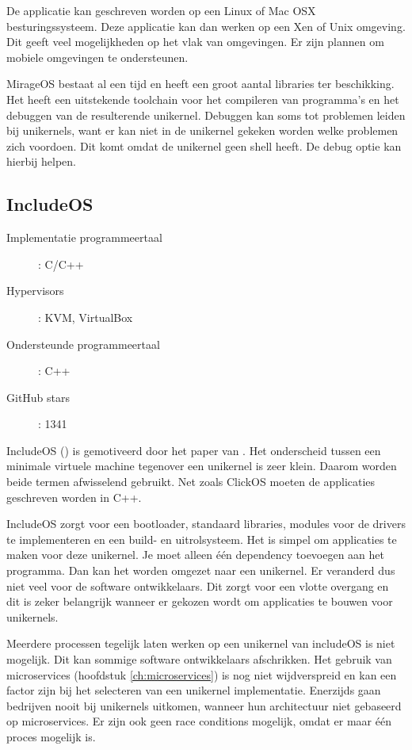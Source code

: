 De applicatie kan geschreven worden op een Linux of Mac OSX besturingssysteem. Deze applicatie kan dan werken op een Xen of Unix omgeving. Dit geeft veel mogelijkheden op het vlak van omgevingen. Er zijn plannen om mobiele omgevingen te ondersteunen.

MirageOS bestaat al een tijd en heeft een groot aantal libraries ter beschikking. Het heeft een uitstekende toolchain voor het compileren van programma's en het debuggen van de resulterende unikernel. Debuggen kan soms tot problemen leiden bij unikernels, want er kan niet in de unikernel gekeken worden welke problemen zich voordoen. Dit komt omdat de unikernel geen shell heeft. De debug optie kan hierbij helpen.

\subsection{IncludeOS}
\begin{description}
  \item [Implementatie programmeertaal]: C/C++
  \item [Hypervisors]: KVM, VirtualBox
  \item [Ondersteunde programmeertaal]: C++
  \item [GitHub stars]: 1341
\end{description}

IncludeOS (\cite{oslo_and_akershus_university_college_hioa-cs/includeos_????}) is gemotiveerd door het paper van \cite{bratterud_maximizing_2013}. Het onderscheid tussen een minimale virtuele machine tegenover een unikernel is zeer klein. Daarom worden beide termen afwisselend gebruikt. Net zoals ClickOS moeten de applicaties geschreven worden in C++.

IncludeOS zorgt voor een bootloader, standaard libraries, modules voor de drivers te implementeren en een build- en uitrolsysteem. Het is simpel om applicaties te maken voor deze unikernel. Je moet alleen één dependency toevoegen aan het programma. Dan kan het worden omgezet naar een unikernel. Er veranderd dus niet veel voor de software ontwikkelaars. Dit zorgt voor een vlotte overgang en dit is zeker belangrijk wanneer er gekozen wordt om applicaties te bouwen voor unikernels.

Meerdere processen tegelijk laten werken op een unikernel van includeOS is niet mogelijk. Dit kan sommige software ontwikkelaars afschrikken. Het gebruik van microservices (hoofdstuk \ref{ch:microservices}) is nog niet wijdverspreid en kan een factor zijn bij het selecteren van een unikernel implementatie. Enerzijds gaan bedrijven nooit bij unikernels uitkomen, wanneer hun architectuur niet gebaseerd op microservices. Er zijn ook geen race conditions mogelijk, omdat er maar één proces mogelijk is.

